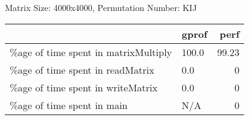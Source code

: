 \documentclass{article}
\begin{document}
    Matrix Size: 4000x4000, Permutation Number: KIJ \\
    \begin{tabular}{llr}
\hline
                                      & gprof   &   perf \\
\hline
 \%age of time spent in matrixMultiply & 100.0   &  99.23 \\
 \%age of time spent in readMatrix     & 0.0     &   0    \\
 \%age of time spent in writeMatrix    & 0.0     &   0    \\
 \%age of time spent in main           & N/A     &   0    \\
\hline
\end{tabular}
    
\end{document}
